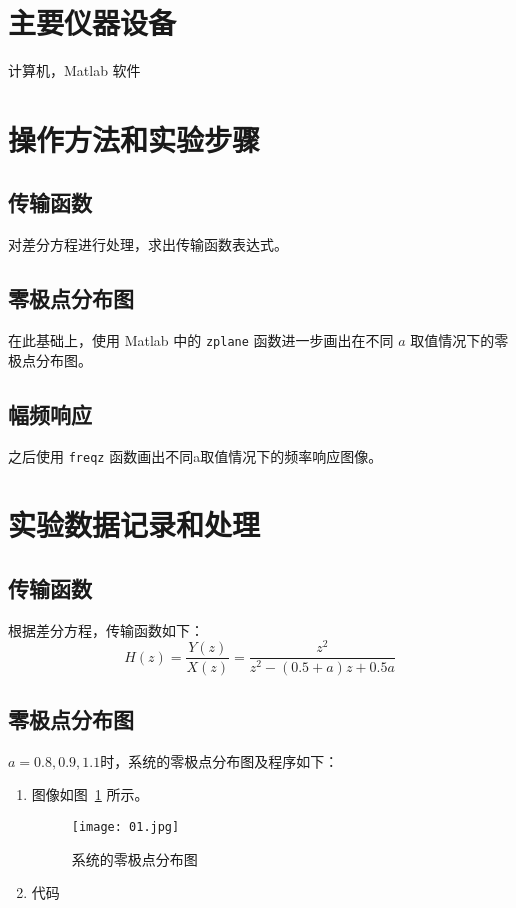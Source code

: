 \documentclass{xjtureport}
\begin{document}
\section{主要仪器设备}
计算机，Matlab 软件
\section{操作方法和实验步骤}
\subsection{传输函数}
对差分方程进行处理，求出传输函数表达式。
\subsection{零极点分布图}
在此基础上，使用 Matlab 中的 \texttt{zplane} 函数进一步画出在不同 $a$ 取值情况下的零极点分布图。
\subsection{幅频响应}
之后使用 \texttt{freqz} 函数画出不同a取值情况下的频率响应图像。

\section{实验数据记录和处理}
\subsection{传输函数}
根据差分方程，传输函数如下：
$$H(z) = \frac{Y(z)}{X(z)} = \frac{z^2}{z^2-(0.5+a)z+0.5a}$$
\subsection{零极点分布图}
$a = 0.8, 0.9, 1.1$时，系统的零极点分布图及程序如下：
\begin{enumerate}
    \item 图像如图~\ref{fig:dist} 所示。
          \begin{figure}[!htbp]
              \centering
              \texttt{[image: 01.jpg]}
              \caption{系统的零极点分布图}
              \label{fig:dist}
          \end{figure}
    \item 代码
          
\end{enumerate}
\end{document}
